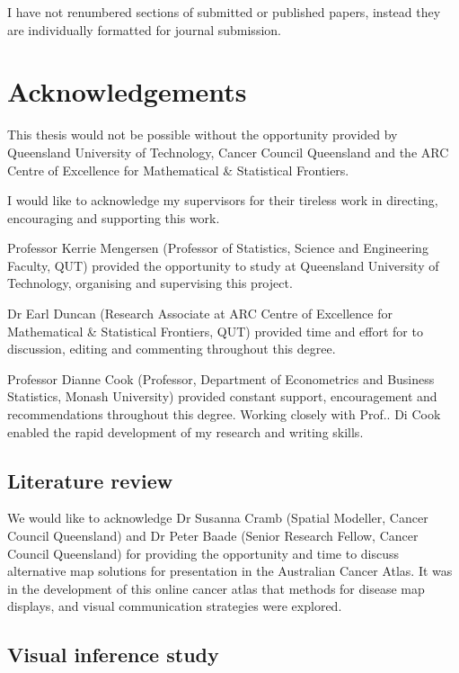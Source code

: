 \documentclass{monashthesis}
\begin{document}
I have not renumbered sections of submitted or published papers, instead they are individually formatted for journal submission.

\hypertarget{acknowledgements}{%
\chapter*{Acknowledgements}\label{acknowledgements}}

This thesis would not be possible without the opportunity provided by Queensland University of Technology, Cancer Council Queensland and the ARC Centre of Excellence for Mathematical \& Statistical Frontiers.

I would like to acknowledge my supervisors for their tireless work in directing, encouraging and supporting this work.

Professor Kerrie Mengersen (Professor of Statistics, Science and Engineering Faculty, QUT) provided the opportunity to study at Queensland University of Technology, organising and supervising this project.

Dr Earl Duncan (Research Associate at ARC Centre of Excellence for Mathematical \& Statistical Frontiers, QUT) provided time and effort for to discussion, editing and commenting throughout this degree.

Professor Dianne Cook (Professor, Department of Econometrics and Business Statistics, Monash University) provided constant support, encouragement and recommendations throughout this degree.
Working closely with Prof.. Di Cook enabled the rapid development of my research and writing skills.

\hypertarget{literature-review}{%
\section{Literature review}\label{literature-review}}

We would like to acknowledge Dr Susanna Cramb (Spatial Modeller, Cancer Council Queensland) and Dr Peter Baade (Senior Research Fellow, Cancer Council Queensland) for providing the opportunity and time to discuss alternative map solutions for presentation in the Australian Cancer Atlas.
It was in the development of this online cancer atlas that methods for disease map displays, and visual communication strategies were explored.

\hypertarget{visual-inference-study}{%
\section{Visual inference study}\label{visual-inference-study}}
\end{document}

